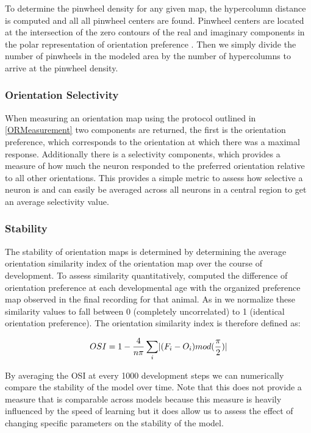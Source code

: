 To determine the pinwheel density for any given map, the hypercolumn
distance is computed and all all pinwheel centers are found. Pinwheel
centers are located at the intersection of the zero contours of the
real and imaginary components in the polar representation of
orientation preference \citep{Lowel1998}. Then we simply divide the
number of pinwheels in the modeled area by the number of hypercolumns
to arrive at the pinwheel density.

\subsubsection{Orientation Selectivity}

When measuring an orientation map using the protocol outlined in
\ref{ORMeasurement} two components are returned, the first is the
orientation preference, which corresponds to the orientation at which
there was a maximal response. Additionally there is a selectivity
components, which provides a measure of how much the neuron responded
to the preferred orientation relative to all other orientations. This
provides a simple metric to assess how selective a neuron is and can
easily be averaged across all neurons in a central region to get an
average selectivity value.

\subsubsection{Stability}

The stability of orientation maps is determined by determining the
average orientation similarity index of the orientation map over the
course of development. To assess similarity quantitatively,
\cite{Chapman1996} computed the difference of orientation preference
at each developmental age with the organized preference map observed
in the final recording for that animal. As in \cite{Stevens2013} we
normalize these similarity values to fall between 0 (completely
uncorrelated) to 1 (identical orientation preference). The orientation
similarity index is therefore defined as:

\begin{equation}
  OSI = 1 - \frac{4}{n\pi} \sum_{i}\lvert(F_{i}-O_{i})mod(\frac{\pi}{2})\rvert
\end{equation}

By averaging the OSI at every 1000 development steps we can
numerically compare the stability of the model over time. Note that
this does not provide a measure that is comparable across models
because this measure is heavily influenced by the speed of learning
but it does allow us to assess the effect of changing specific
parameters on the stability of the model.

